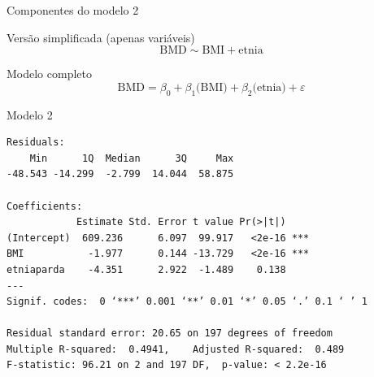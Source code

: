 \documentclass{beamer}
\begin{document}
\begin{frame}{\scriptsize Componentes do modelo 2}
  \begin{block}{\footnotesize Versão simplificada (apenas variáveis)}
    \footnotesize
    \begin{displaymath}
      \text{BMD} \sim \text{BMI} + \text{etnia}
    \end{displaymath}
  \end{block}
  \bigskip
  \bigskip
  \begin{block}{Modelo completo}
    \begin{displaymath}
      \text{BMD} =\beta_0 + \beta_1 \text{(BMI)} + \beta_2 \text{(etnia)} +\varepsilon
    \end{displaymath}
  \end{block}
  \vfill
\end{frame}

\begin{frame}[fragile]{\scriptsize }
  \begin{center}
    \begin{exampleblock}{Modelo 2}
      \tiny
\begin{verbatim}
Residuals:
    Min      1Q  Median      3Q     Max 
-48.543 -14.299  -2.799  14.044  58.875 

Coefficients:
            Estimate Std. Error t value Pr(>|t|)    
(Intercept)  609.236      6.097  99.917   <2e-16 ***
BMI           -1.977      0.144 -13.729   <2e-16 ***
etniaparda    -4.351      2.922  -1.489    0.138    
---
Signif. codes:  0 ‘***’ 0.001 ‘**’ 0.01 ‘*’ 0.05 ‘.’ 0.1 ‘ ’ 1

Residual standard error: 20.65 on 197 degrees of freedom
Multiple R-squared:  0.4941,	Adjusted R-squared:  0.489 
F-statistic: 96.21 on 2 and 197 DF,  p-value: < 2.2e-16
\end{verbatim}
    \end{exampleblock}
  \end{center}
\end{frame}
\end{document}
